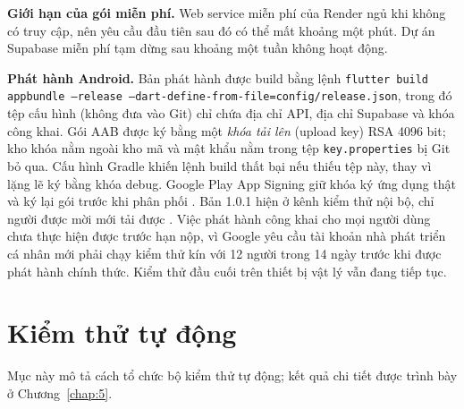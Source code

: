 \textbf{Giới hạn của gói miễn phí.} Web service miễn phí của Render ngủ khi không có truy cập, nên yêu cầu đầu tiên sau đó có thể mất khoảng một phút. Dự án Supabase miễn phí tạm dừng sau khoảng một tuần không hoạt động.

\textbf{Phát hành Android.} Bản phát hành được build bằng lệnh \texttt{flutter build appbundle --release --dart-define-from-file=\allowbreak config/release.json}, trong đó tệp cấu hình (không đưa vào Git) chỉ chứa địa chỉ API, địa chỉ Supabase và khóa công khai. Gói AAB được ký bằng một \emph{khóa tải lên} (upload key) RSA 4096 bit; kho khóa nằm ngoài kho mã và mật khẩu nằm trong tệp \texttt{key.\allowbreak{}properties} bị Git bỏ qua. Cấu hình Gradle khiến lệnh build thất bại nếu thiếu tệp này, thay vì lặng lẽ ký bằng khóa debug. Google Play App Signing giữ khóa ký ứng dụng thật và ký lại gói trước khi phân phối \parencite{ch3-play-app-signing}. Bản 1.0.1 hiện ở kênh kiểm thử nội bộ, chỉ người được mời mới tải được \parencite{ch3-play-testing}. Việc phát hành công khai cho mọi người dùng chưa thực hiện được trước hạn nộp, vì Google yêu cầu tài khoản nhà phát triển cá nhân mới phải chạy kiểm thử kín với 12 người trong 14 ngày trước khi được phát hành chính thức. Kiểm thử đầu cuối trên thiết bị vật lý vẫn đang tiếp tục.

\section{Kiểm thử tự động}
\label{sec:ch3-testing}

Mục này mô tả cách tổ chức bộ kiểm thử tự động; kết quả chi tiết được trình bày ở Chương~\ref{chap:5}.

